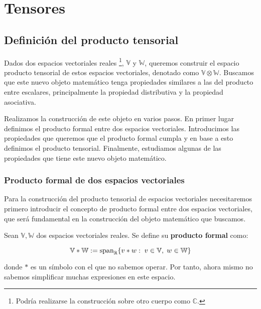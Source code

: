 \section{Tensores}

\subsection{Definición del producto tensorial} \label{sec:deftensor}

Dados dos espacios vectoriales reales \footnote{Podría realizarse la construcción sobre otro cuerpo como $\mathbb{C}$.}, $\mathbb{V}$ y $\mathbb{W}$, queremos construir el espacio producto tensorial de estos espacios vectoriales, denotado como $\mathbb{V} \otimes \mathbb{W}$. Buscamos que este nuevo objeto matemático tenga propiedades similares a las del producto entre escalares, principalmente la propiedad distributiva y la propiedad asociativa.

Realizamos la construcción de este objeto en varios pasos. En primer lugar definimos el producto formal entre dos espacios vectoriales. Introducimos las propiedades que queremos que el producto formal cumpla y en base a esto definimos el producto tensorial. Finalmente, estudiamos algunas de las propiedades que tiene este nuevo objeto matemático.

\subsubsection{Producto formal de dos espacios vectoriales}

Para la construcción del producto tensorial de espacios vectoriales necesitaremos primero introducir el concepto de producto formal entre dos espacios vectoriales, que será fundamental en la construcción del objeto matemático que buscamos.

\begin{definicion}
	Sean $\mathbb{V}, \mathbb{W}$ dos espacios vectoriales reales. Se define su \textbf{producto formal} como:

	\begin{equation}
		\mathbb{V} \ast \mathbb{W} := \text{span}_{\mathbb{R}} \{ v \ast w : \; v \in \mathbb{V}, \; w \in \mathbb{W} \}
	\end{equation}

	donde $*$ es un símbolo con el que no sabemos operar. Por tanto, ahora mismo no sabemos simplificar muchas expresiones en este espacio.
\end{definicion}

